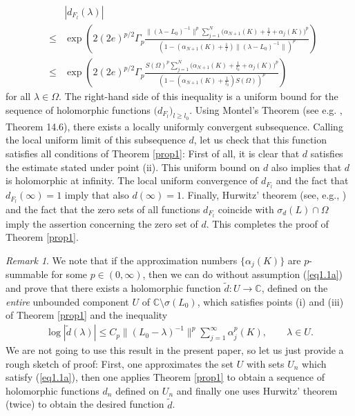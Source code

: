 \documentclass[12pt,a4paper]{article}
\theoremstyle{definition}
\theoremstyle{remark}
\newtheorem {rem}[theorem]{Remark}
\numberwithin{equation}{section}
\newcommand{\mc}{{\mathbb C}}
\begin{document}
\begin{eqnarray*} 
&&  |d_{F_l}(\lambda)| \\
&\leq&  \exp\left(2(2e)^{p/2} \Gamma_p \frac{\|(\lambda - L_0)^{-1}\|^p \sum_{j=1}^N\Big( \alpha_{N+1}(K)+\frac{1}{l} + \alpha_j(K) \Big)^p}{\left(1-(\alpha_{N+1}(K)+\frac{1}{l})\|(\lambda-L_0)^{-1}\|\right)^p}\right) \\
&\leq&  \exp\left(2(2e)^{p/2} \Gamma_p \frac{S(\Omega)^p \sum_{j=1}^N\Big( \alpha_{N+1}(K)+\frac{1}{l_0} + \alpha_j(K) \Big)^p}{\left(1-(\alpha_{N+1}(K)+\frac{1}{l_0})S(\Omega)\right)^p}\right)
\end{eqnarray*}
for all $\lambda\in \Omega$. The right-hand side of this inequality is a uniform bound for the sequence of holomorphic functions $\big(d_{F_l}\big)_{l\geq l_0}$. Using Montel's Theorem (see e.g. \cite{rudin}, Theorem 14.6), there exists a locally uniformly convergent subsequence. Calling the local uniform limit of this subsequence $d$, let us check that this function satisfies all conditions of Theorem \ref{prop1}: First of all, it is clear that $d$ satisfies the estimate stated under point (ii). This uniform bound on $d$ also implies that $d$ is holomorphic at infinity. The local uniform convergence of $d_{F_l}$ and the fact that $d_{F_l}(\infty)=1$ imply that also $d(\infty)=1$. Finally, Hurwitz' theorem (see, e.g., \cite{MR503901}) and the fact that the zero sets of all functions $d_{F_l}$ coincide with $\sigma_d(L)\cap \Omega$ imply the assertion concerning the zero set of $d$. This completes the proof of Theorem \ref{prop1}. 
\begin{rem} 	
We note that if the approximation numbers $\{\alpha_j(K)\}$ are $p$-summable for some $p\in(0,\infty)$, then we can do without assumption (\ref{eq1.1a})  and prove that there exists a holomorphic function $\tilde{d}:  U \rightarrow \mathbb{C}$, defined on the \emph{entire} unbounded component $U$ of $\mc \setminus \sigma(L_0)$,  which satisfies points (i) and (iii) of Theorem \ref{prop1} and the inequality 
\begin{align*} 
\log |\tilde{d}(\lambda)|\leq C_p \|(L_0-\lambda)^{-1}\|^p\sum_{j=1}^\infty \alpha_j^p(K), \qquad \lambda \in U.
\end{align*} 
We are not going to use this result in the present paper, so let us just provide a rough sketch of proof: First, one approximates the set $U$ with sets $U_n$ which satisfy (\ref{eq1.1a}), then one applies Theorem \ref{prop1} to obtain a sequence of holomorphic functions $d_n$ defined on $U_n$ and finally one uses Hurwitz' theorem (twice) to obtain the desired function $\tilde{d}$. 
\end{rem}
\end{document}
